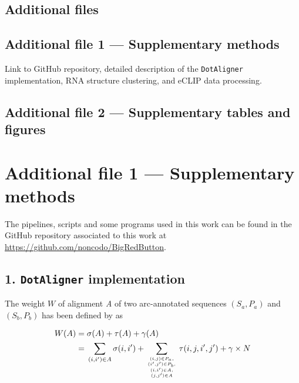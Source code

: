 \documentclass{bmcart}
\newcommand\dotaligner{\texttt{DotAligner}}
\begin{document}
\begin{backmatter}
\section*{Additional files}

 \subsection*{Additional file 1 --- Supplementary methods}

 Link to GitHub repository, detailed description of the \dotaligner{} implementation, RNA structure clustering, and eCLIP data processing. 

 \subsection*{Additional file 2 --- Supplementary tables and figures}

\end{backmatter}

\clearpage

\section*{Additional file 1 --- Supplementary methods}
The pipelines, scripts and some programs used in this work can be found in the 
GitHub repository associated to this work at \url{https://github.com/noncodo/BigRedButton}. 

\subsection*{ 1. \dotaligner{} implementation }
\noindent The weight $W$ of alignment \emph{A}
of two arc-annotated sequences $(S_a,P_a)$ and $(S_b,P_b)$ has been defined by \cite{Palu2010} as

\begin{equation}\label{eq1}
\begin{aligned}
	W(A) ={} & \sigma(A) + \tau(A) + \gamma(A) \\
	     ={} & \sum_{(i,i^\prime) \in A} \sigma(i,i^\prime) + \sum_{(i,j) \in
	P_a,\atop {(i^\prime,j^\prime) \in P_b,\atop {(i,i^\prime) \in
	A,\atop (j,j^\prime) \in A}}} \tau(i,j,i^\prime,j^\prime) + \gamma
	\times N
\end{aligned}
\end{equation}
\end{document}
